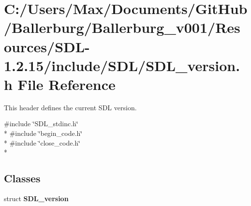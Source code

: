 \section{C\+:/\+Users/\+Max/\+Documents/\+Git\+Hub/\+Ballerburg/\+Ballerburg\+\_\+v001/\+Resources/\+S\+D\+L-\/1.2.15/include/\+S\+D\+L/\+S\+D\+L\+\_\+version.h File Reference}
\label{_s_d_l__version_8h}


This header defines the current S\+D\+L version.  


{\ttfamily \#include \char`\"{}S\+D\+L\+\_\+stdinc.\+h\char`\"{}}\\*
{\ttfamily \#include \char`\"{}begin\+\_\+code.\+h\char`\"{}}\\*
{\ttfamily \#include \char`\"{}close\+\_\+code.\+h\char`\"{}}\\*
\subsection*{Classes}
\begin{DoxyCompactItemize}
\item 
struct {\bf S\+D\+L\+\_\+version}
\end{DoxyCompactItemize}
